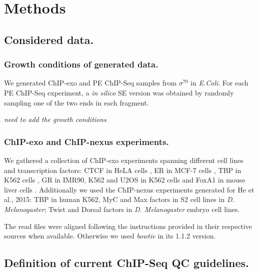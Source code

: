 \documentclass{bmcart}\usepackage[]{graphicx}\usepackage[]{color}
\newcommand{\sig}{\sigma^{70}}
\begin{document}
\section{Methods}
\label{sec:methods}



\subsection*{Considered data.}


\subsubsection*{Growth conditions of generated data.}

We generated ChIP-exo and PE ChIP-Seq samples from $\sig$ in
\emph{E.Coli}. For each PE ChIP-Seq experiment, a \emph{in silico} SE
version was obtained by randomly sampling one of the two ends in each
fragment. 

{\color{red}\emph{need to add the growth conditions}}

\subsubsection*{ChIP-exo and ChIP-nexus experiments.}

We gathered a collection of ChIP-exo experiments spanning different
cell lines and transcription factors: CTCF in HeLA cells \cite{exo1},
ER in MCF-7 cells \cite{exoillumina}, TBP in K562 cells
\cite{venters13}, GR in IMR90, K562 and U2OS in K562 cells
\cite{starick15} and FoxA1 in mouse liver cells
\cite{exoillumina}. Additionally we used the ChIP-nexus experiments
generated for He et al., 2015: TBP in human K562, MyC and Max factors
in S2 cell lines in \emph{D. Melanogaster}; Twist and Dorsal factors
in \emph{D. Melanogaster} embryo cell lines.

The read files were aligned following the instructions provided in
their respective sources when available. Otherwise we used
\emph{bowtie} in its 1.1.2 version.

\subsection*{Definition of current ChIP-Seq QC guidelines.}

\end{document}
